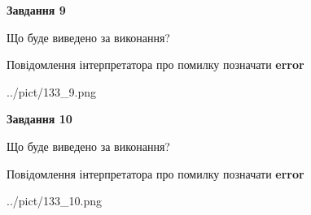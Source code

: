 \documentclass[12pt, ukrainian]{article}
\begin{document}
{{\begin {center}\textbf{Завдання 9}\end {center}}\par
Що буде виведено за виконання? \par
Повідомлення інтерпретатора про помилку позначати \textbf{error}

\begin{center}
	{../pict/133_9.png}
\end{center}
\newpage

{\begin {center}\textbf{Завдання 10}\end {center}}\par
Що буде виведено за виконання? \par
Повідомлення інтерпретатора про помилку позначати \textbf{error}

\begin{center}
	{../pict/133_10.png}
\end{center}
\newpage

}
\end{document}

